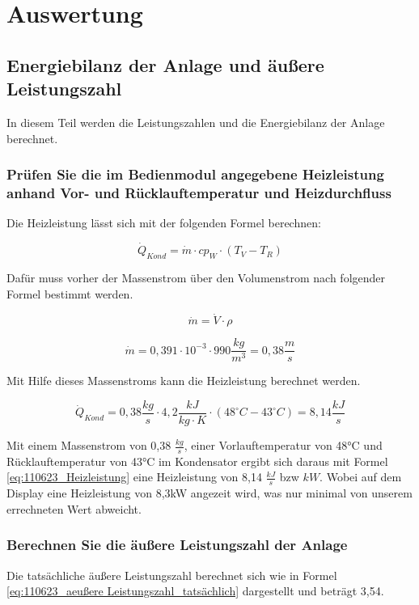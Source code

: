 \newpage
\section{Auswertung}
\label{sec:Auswertung}
\subsection{Energiebilanz der Anlage und äußere Leistungszahl}
In diesem Teil werden die Leistungszahlen und die Energiebilanz der Anlage berechnet.

\subsubsection{Prüfen Sie die im Bedienmodul angegebene Heizleistung anhand Vor- und Rücklauftemperatur und Heizdurchfluss}
\label{subsubsec:Heizleistung}

Die Heizleistung lässt sich mit der folgenden Formel berechnen:

\begin{equation}
\dot Q_{Kond}= \dot m \cdot cp_{W} \cdot (T_{V} - T_{R})
\label{eq:110623_Heizleistung}
\end{equation}

Dafür muss vorher der Massenstrom über den Volumenstrom nach folgender Formel bestimmt werden.

\begin{equation}
    \dot{m}= \dot{V}\cdot \rho
\end{equation}

$$\dot{m}= 0,391 \cdot 10^{-3} \cdot 990 \frac{kg}{m^3}=0,38 \frac{m}{s}$$

Mit Hilfe dieses Massenstroms kann die Heizleistung berechnet werden.

$$\dot Q_{Kond}= 0,38 \frac{kg}{s} \cdot 4,2 \frac{kJ}{kg \cdot K} \cdot (48 ^{\circ}C - 43 ^{\circ}C) = 8,14 \frac{kJ}{s}$$

Mit einem Massenstrom von 0,38 $\frac{kg}{s}$, einer Vorlauftemperatur von 48°C und Rücklauftemperatur von 43°C im Kondensator ergibt sich daraus mit Formel \ref{eq:110623_Heizleistung} eine Heizleistung von 8,14 $\frac{kJ}{s}$ bzw $kW$. Wobei auf dem Display eine Heizleistung von 8,3kW angezeit wird, was nur minimal von unserem errechneten Wert abweicht.
\subsubsection{Berechnen Sie die äußere Leistungszahl der Anlage}
Die tatsächliche äußere Leistungszahl berechnet sich wie in Formel \ref{eq:110623_aeußere Leistungszahl_tatsächlich} dargestellt und beträgt 3,54.

